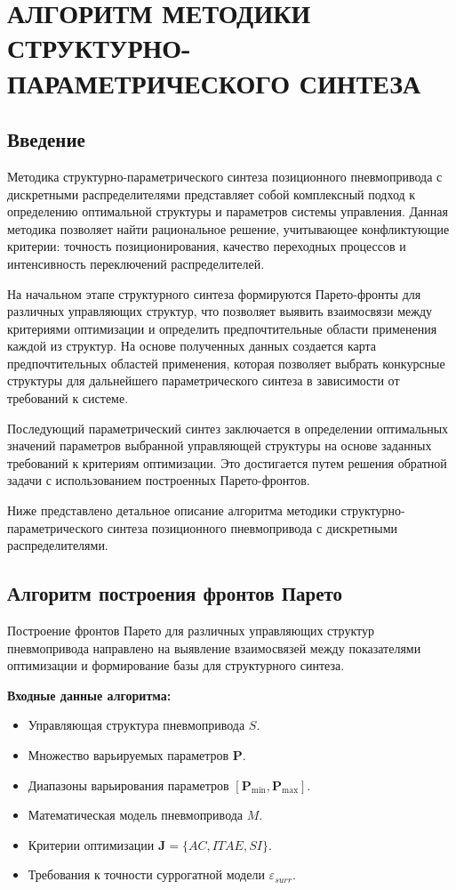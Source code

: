 \chapter{АЛГОРИТМ МЕТОДИКИ СТРУКТУРНО-ПАРАМЕТРИЧЕСКОГО СИНТЕЗА}\label{app:methodology}


\section*{Введение}

Методика структурно-параметрического синтеза позиционного пневмопривода с дискретными распределителями
представляет собой комплексный подход к определению оптимальной структуры и параметров системы управления. Данная методика
позволяет найти рациональное решение, учитывающее конфликтующие критерии: точность позиционирования, качество переходных
процессов и интенсивность переключений распределителей.

На начальном этапе структурного синтеза формируются Парето-фронты для различных управляющих
структур, что позволяет выявить взаимосвязи между критериями оптимизации и определить предпочтительные области
применения каждой из структур. На основе полученных данных создается карта предпочтительных областей применения,
которая позволяет выбрать конкурсные структуры для дальнейшего параметрического синтеза в зависимости
от требований к системе.

Последующий параметрический синтез заключается в определении оптимальных значений параметров выбранной управляющей
структуры на основе заданных требований к критериям оптимизации. Это достигается путем решения обратной
задачи с использованием построенных Парето-фронтов.

Ниже представлено детальное описание алгоритма методики структурно-параметрического
синтеза позиционного пневмопривода с дискретными распределителями.


\section*{Алгоритм построения фронтов Парето}

Построение фронтов Парето для различных управляющих структур пневмопривода направлено на
выявление взаимосвязей между показателями оптимизации и формирование базы для структурного синтеза.

\textbf{Входные данные алгоритма:}
\begin{itemize}
    \item Управляющая структура пневмопривода $S$.
    \item Множество варьируемых параметров $\mathbf{P}$.
    \item Диапазоны варьирования параметров $[\mathbf{P}_{\min}, \mathbf{P}_{\max}]$.
    \item Математическая модель пневмопривода $M$.
    \item Критерии оптимизации $\mathbf{J} = \{AC, ITAE, SI\}$.
    \item Требования к точности суррогатной модели $\varepsilon_{surr}$.
\end{itemize}

